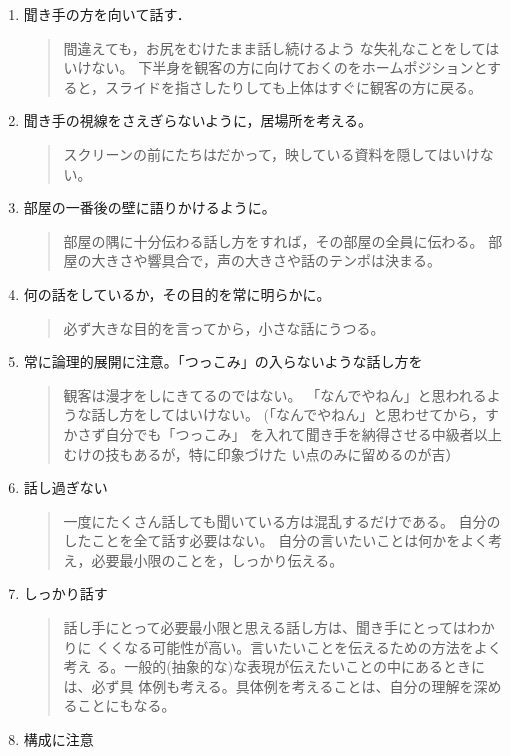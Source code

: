 \documentclass[12pt, ]{jsarticle}
\begin{document}
\begin{enumerate}
\item
  聞き手の方を向いて話す．

  \begin{quote}
  間違えても，お尻をむけたまま話し続けるよう
  な失礼なことをしてはいけない。
  下半身を観客の方に向けておくのをホームポジションとすると，スライドを指さしたりしても上体はすぐに観客の方に戻る。
  \end{quote}
\item
  聞き手の視線をさえぎらないように，居場所を考える。

  \begin{quote}
  スクリーンの前にたちはだかって，映している資料を隠してはいけない。
  \end{quote}
\item
  部屋の一番後の壁に語りかけるように。

  \begin{quote}
  部屋の隅に十分伝わる話し方をすれば，その部屋の全員に伝わる。
  部屋の大きさや響具合で，声の大きさや話のテンポは決まる。
  \end{quote}
\item
  何の話をしているか，その目的を常に明らかに。

  \begin{quote}
  必ず大きな目的を言ってから，小さな話にうつる。
  \end{quote}
\item
  常に論理的展開に注意。「つっこみ」の入らないような話し方を

  \begin{quote}
  観客は漫才をしにきてるのではない。
  「なんでやねん」と思われるような話し方をしてはいけない。
  (「なんでやねん」と思わせてから，すかさず自分でも「つっこみ」
  を入れて聞き手を納得させる中級者以上むけの技もあるが，特に印象づけた
  い点のみに留めるのが吉）
  \end{quote}
\item
  話し過ぎない

  \begin{quote}
  一度にたくさん話しても聞いている方は混乱するだけである。
  自分のしたことを全て話す必要はない。
  自分の言いたいことは何かをよく考え，必要最小限のことを，しっかり伝える。
  \end{quote}
\item
  しっかり話す

  \begin{quote}
  話し手にとって必要最小限と思える話し方は、聞き手にとってはわかりに
  くくなる可能性が高い。言いたいことを伝えるための方法をよく考え
  る。一般的(抽象的な)な表現が伝えたいことの中にあるときには、必ず具
  体例も考える。具体例を考えることは、自分の理解を深めることにもなる。
  \end{quote}
\item
  構成に注意


\end{enumerate}
\end{document}
